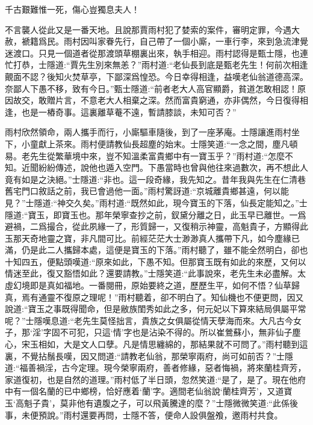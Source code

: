 \begin{poem}
    \begin{pl}
        千古艱難惟一死，傷心豈獨息夫人！
    \end{pl}
\end{poem}


\begin{parag}
    不言襲人從此又是一番天地。且說那賈雨村犯了婪索的案件，審明定罪，今遇大赦，褫籍爲民。雨村因叫家眷先行，自己帶了一個小廝，一車行李，來到急流津覺迷渡口。只見一個道者從那渡頭草棚裏出來，執手相迎。雨村認得是甄士隱，也連忙打恭，士隱道:“賈先生別來無恙？”雨村道:“老仙長到底是甄老先生！何前次相逢覿面不認？後知火焚草亭，下鄙深爲惶恐。今日幸得相逢，益嘆老仙翁道德高深。奈鄙人下愚不移，致有今日。”甄士隱道:“前者老大人高官顯爵，貧道怎敢相認！原因故交，敢贈片言，不意老大人相棄之深。然而富貴窮通，亦非偶然，今日復得相逢，也是一樁奇事。這裏離草菴不遠，暫請膝談，未知可否？”
\end{parag}


\begin{parag}
    雨村欣然領命，兩人攜手而行，小廝驅車隨後，到了一座茅庵。士隱讓進雨村坐下，小童獻上茶來。雨村便請教仙長超塵的始末。士隱笑道:“一念之間，塵凡頓易。老先生從繁華境中來，豈不知溫柔富貴鄉中有一寶玉乎？”雨村道:“怎麼不知。近聞紛紛傳述，說他也遁入空門。下愚當時也曾與他往來過數次，再不想此人竟有如是之決絕。”士隱道:“非也。這一段奇緣，我先知之。昔年我與先生在仁清巷舊宅門口敘話之前，我已會過他一面。”雨村驚訝道:“京城離貴鄉甚遠，何以能見？”士隱道:“神交久矣。”雨村道:“既然如此，現今寶玉的下落，仙長定能知之。”士隱道:“寶玉，即寶玉也。那年榮寧查抄之前，釵黛分離之日，此玉早已離世。一爲避禍，二爲撮合，從此夙緣一了，形質歸一，又復稍示神靈，高魁貴子，方顯得此玉那天奇地靈之寶，非凡間可比。前經茫茫大士渺渺真人攜帶下凡，如今塵緣已滿，仍是此二人攜歸本處，這便是寶玉的下落。”雨村聽了，雖不能全然明白，卻也十知四五，便點頭嘆道:“原來如此，下愚不知。但那寶玉既有如此的來歷，又何以情迷至此，復又豁悟如此？還要請教。”士隱笑道:“此事說來，老先生未必盡解。太虛幻境即是真如福地。一番閱冊，原始要終之道，歷歷生平，如何不悟？仙草歸真，焉有通靈不復原之理呢！”雨村聽着，卻不明白了。知仙機也不便更問，因又說道:“寶玉之事既得聞命，但是敝族閨秀如此之多，何元妃以下算來結局俱屬平常呢？”士隱嘆息道:“老先生莫怪拙言，貴族之女俱屬從情天孽海而來。大凡古今女子，那‘淫’字固不可犯，只這‘情’字也是沾染不得的。所以崔鶯蘇小，無非仙子塵心，宋玉相如，大是文人口孽。凡是情思纏綿的，那結果就不可問了。”雨村聽到這裏，不覺拈鬚長嘆，因又問道:“請教老仙翁，那榮寧兩府，尚可如前否？”士隱道:“福善禍淫，古今定理。現今榮寧兩府，善者修緣，惡者悔禍，將來蘭桂齊芳，家道復初，也是自然的道理。”雨村低了半日頭，忽然笑道:“是了，是了。現在他府中有一個名蘭的已中鄉榜，恰好應着‘蘭’字。適間老仙翁說‘蘭桂齊芳’，又道寶玉‘高魁子貴’，莫非他有遺腹之子，可以飛黃騰達的麼？”士隱微微笑道:“此係後事，未便預說。”雨村還要再問，士隱不答，便命人設俱盤飧，邀雨村共食。
\end{parag}


